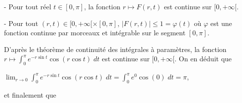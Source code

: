 {\begin{enumerate}
{- Pour tout réel $t\in[0,\pi]$, la fonction $r\mapsto F(r,t)$ est continue sur $[0,+\infty[$.

- Pour tout $(r,t)\in[0,+\infty[\times[0,\pi]$, $|F(r,t)|\leqslant1=\varphi(t)$ où $\varphi$ est une fonction continue par morceaux et intégrable sur le segment $[0,\pi]$.

D'après le théorème de continuité des intégrales à paramètres, la fonction $r\mapsto\int_{0}^{\pi}e^{-r\sin t}\cos(r\cos t)\;dt$ est continue sur $[0,+\infty[$. On en déduit que

\begin{center}
$\lim_{r \rightarrow 0}\int_{0}^{\pi}e^{-r\sin t}\cos(r\cos t)\;dt=\int_{0}^{\pi}e^0\cos(0)\;dt=\pi$,
\end{center}

et finalement que

\begin{center}
\end{center}}
\end{enumerate}
}
